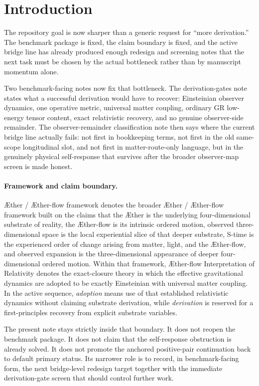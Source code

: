 \documentclass[11pt]{article}
\newcommand{\Aether}{\AE{}ther}
\newcommand{\Aflow}{\AE{}ther-flow}
\newcommand{\TheoryName}{\Aflow{} Interpretation of Relativity}
\newcommand{\TheoryProgram}{\Aether{} / \Aflow{} framework}
\begin{document}
\section{Introduction}

The repository goal is now sharper than a generic request for ``more derivation.'' The benchmark package is fixed, the claim boundary is fixed, and the active bridge line has already produced enough redesign and screening notes that the next task must be chosen by the actual bottleneck rather than by manuscript momentum alone.

Two benchmark-facing notes now fix that bottleneck. The derivation-gates note states what a successful derivation would have to recover: Einsteinian observer dynamics, one operative metric, universal matter coupling, ordinary GR low-energy tensor content, exact relativistic recovery, and no genuine observer-side remainder. The observer-remainder classification note then says where the current bridge line actually fails: not first in bookkeeping terms, not first in the old same-scope longitudinal slot, and not first in matter-route-only language, but in the genuinely physical self-response that survives after the broader observer-map screen is made honest.

\paragraph{Framework and claim boundary.}
\TheoryProgram{} denotes the broader \Aether{} / \Aflow{} framework built on the claims that the \Aether{} is the underlying four-dimensional substrate of reality, the \Aflow{} is its intrinsic ordered motion, observed three-dimensional space is the local experiential slice of that deeper substrate, S-time is the experienced order of change arising from matter, light, and the \Aflow{}, and observed expansion is the three-dimensional appearance of deeper four-dimensional ordered motion. Within that framework, \TheoryName{} denotes the exact-closure theory in which the effective gravitational dynamics are adopted to be exactly Einsteinian with universal matter coupling. In the active sequence, \emph{adoption} means use of that established relativistic dynamics without claiming substrate derivation, while \emph{derivation} is reserved for a first-principles recovery from explicit substrate variables.

The present note stays strictly inside that boundary. It does not reopen the benchmark package. It does not claim that the self-response obstruction is already solved. It does not promote the anchored positive-pair continuation back to default primary status. Its narrower role is to record, in benchmark-facing form, the next bridge-level redesign target together with the immediate derivation-gate screen that should control further work.
\end{document}
